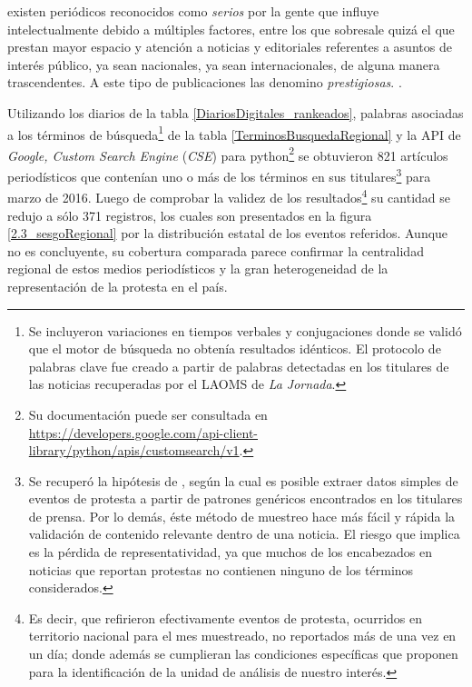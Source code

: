 \documentclass[letterpaper, 11pt]{book}
\theoremstyle{definition}
\theoremstyle{remark}
\begin{document}
\begin{center}
    \begin{minipage}{0.9\linewidth}
        {\setlength{\parindent}{12pt}\small
	    existen periódicos reconocidos como \emph{serios} por la gente que influye intelectualmente debido a múltiples factores, entre los que sobresale quizá el que prestan mayor espacio y atención a noticias y editoriales referentes a asuntos de interés público, ya sean nacionales, ya sean internacionales, de alguna manera trascendentes. 
	    A este tipo de publicaciones las denomino \emph{prestigiosas}.  \normalsize \citep[23]{1996_MorenoDeAlba_Prestigio}.
        }
    \end{minipage}
\end{center}




Utilizando los diarios de la tabla \ref{DiariosDigitales_rankeados}, palabras asociadas a los términos de búsqueda\footnote{
    Se incluyeron variaciones en tiempos verbales y conjugaciones donde se validó que el motor de búsqueda no obtenía resultados idénticos. 
    El protocolo de palabras clave fue creado a partir de palabras detectadas en los titulares de las noticias recuperadas por el LAOMS de \emph{La Jornada}.
} 
de la tabla \ref{TerminosBusquedaRegional} y la API de \emph{Google, Custom Search Engine} (\emph{CSE}) para python\footnote{
    Su documentación puede ser consultada en \url{https://developers.google.com/api-client-library/python/apis/customsearch/v1}.
} 
se obtuvieron 821 artículos periodísticos que contenían uno o más de los términos en sus titulares\footnote{
    Se recuperó la hipótesis de  \citet{2015_Danilova_Linguistic}, según la cual es posible extraer datos simples de eventos de protesta a partir de patrones genéricos encontrados en los titulares de prensa. 
    Por lo demás, éste método de muestreo hace más fácil y rápida la validación de contenido relevante dentro de una noticia. 
    El riesgo que implica es la pérdida de representatividad, ya que muchos de los encabezados en noticias que reportan protestas no contienen ninguno de los términos considerados.
} para marzo de 2016. 
Luego de comprobar la validez de los resultados\footnote{
    Es decir, que refirieron efectivamente eventos de protesta, ocurridos en territorio nacional para el mes muestreado, no reportados más de una vez en un día; donde además se cumplieran las condiciones específicas que \citet{2017_Cadena_ManualLAOMS} proponen para la identificación de la unidad de análisis de nuestro interés.
} su cantidad se redujo a sólo 371 registros, los cuales son presentados en la figura \ref{2.3_sesgoRegional} por la distribución estatal de los eventos referidos. 
Aunque no es concluyente, su cobertura comparada parece confirmar la centralidad regional de estos medios periodísticos y la gran heterogeneidad de la representación de la protesta en el país. 
\end{document}
